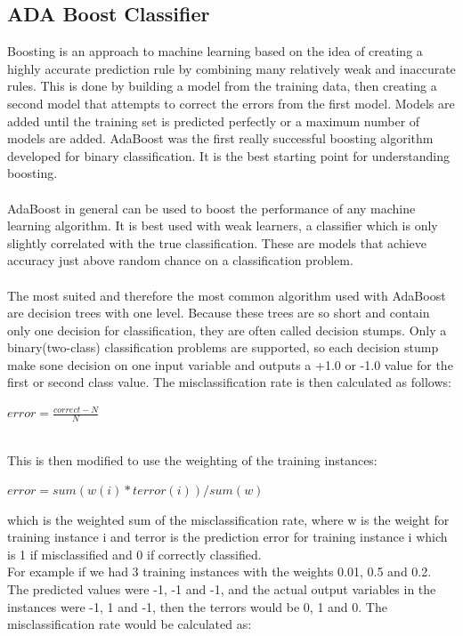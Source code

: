 \documentclass[12pt]{article}
\begin{document}
		\subsection{ADA Boost Classifier}
		\begin{justify}
			\textnormal{Boosting is an approach to machine learning based on the idea of creating a highly accurate prediction rule by combining many relatively weak and inaccurate rules. This is done by building a model from the training data, then creating a second model that attempts to correct the errors from the first model. Models are added until the training set is predicted perfectly or a maximum number of models are added. AdaBoost was the first really successful boosting algorithm developed for binary classification. It is the best starting point for understanding boosting.\\\\AdaBoost in general can be used to boost the performance of any machine learning algorithm. It is best used with weak learners, a classifier which is only slightly correlated with the true classification. These are models that achieve accuracy just above random chance on a classification problem.\\\\The most suited and therefore the most common algorithm used with AdaBoost are decision trees with one level. Because these trees are so short and contain only one decision for classification, they are often called decision stumps. Only a binary(two-class) classification problems are supported, so each decision stump make sone decision on one input variable and outputs a +1.0 or -1.0 value for the first or second class value. The misclassification rate is then calculated as follows: \\}
			\begin{center}
				$ error = \frac{correct - N}{N} $ 
			\end{center}
			\textnormal{\\This is then modified to use the weighting of the training instances:}
			\begin{center}
				$ error = sum(w(i) * terror(i)) / sum(w) $
			\end{center}
			which is the weighted sum of the misclassification rate, where w is the weight for training instance i and terror is the prediction error for training instance i which is 1 if misclassified and 0 if correctly classified.\\
			For example if we had 3 training instances with the weights 0.01, 0.5 and 0.2. The predicted values were -1, -1 and -1, and the actual output variables in the instances were -1, 1 and -1, then the terrors would be 0, 1 and 0. The misclassification rate would be calculated as: 

\end{justify}
\end{document}
